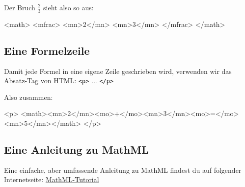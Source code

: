 Der Bruch $\frac{2}{3}$ sieht also so aus:

\begin{codeHTML}
<math>
	<mfrac>
		<mn>2</mn>
		<mn>3</mn>
	</mfrac>
</math>
\end{codeHTML}

\subsection{Eine Formelzeile}

Damit jede Formel in eine eigene Zeile geschrieben wird, verwenden wir das Absatz-Tag von HTML: \texttt{<p>} ... \texttt{</p>}

Also zusammen:
\begin{codeHTML}
<p>
	<math><mn>2</mn><mo>+</mo><mn>3</mn><mo>=</mo><mn>5</mn></math>
</p>
\end{codeHTML}

\subsection{Eine Anleitung zu MathML}

Eine einfache, aber umfassende Anleitung zu MathML findest du auf folgender Internetseite: \href{https://www.math-it.de/Publikationen/MathML_de.html}{MathML-Tutorial}